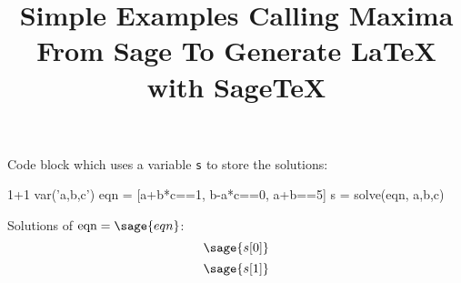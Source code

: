 \documentclass{article}
\begin{document}
	
\title{Simple Examples Calling Maxima From Sage To Generate \LaTeX{} with \textsf{Sage\TeX}}


Code block which uses a variable \texttt{s} to store the solutions:
\begin{sageblock}
	1+1
	var('a,b,c')
	eqn = [a+b*c==1, b-a*c==0, a+b==5]
	s = solve(eqn, a,b,c)
\end{sageblock}

Solutions of $\mbox{eqn}=\sage{eqn}$:
\[
\sage{s[0]}
\]
\[
\sage{s[1]}
\]
\end{document}

